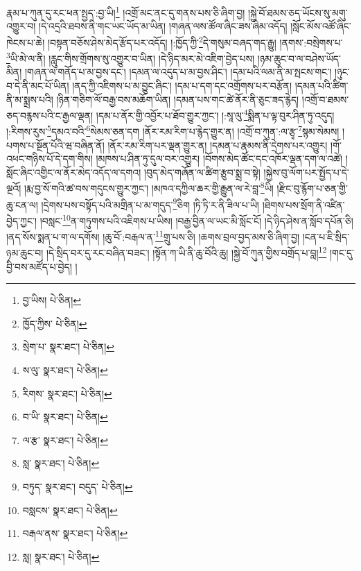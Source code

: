 རྣམ་པ་ཀུན་དུ་རང་ཕན་སྤྱད་:བྱ་ཡི།\footnote{བྱ་ཡིས།  པེ་ཅིན། } །འགྲོ་མང་ནང་དུ་གནས་པས་ཅི་ཞིག་བྱ། །སྐྱེ་བོ་ཐམས་ཅད་ཡོངས་སུ་མགུ་འགྱུར་བ། །དེ་འདྲའི་ཐབས་ནི་གང་ཡང་ཡོད་མ་ཡིན། །གཞན་ལས་ཚོལ་ཞིང་ཟས་ཞིམ་འདོད། །སློང་མོས་འཚོ་ཞིང་ཁེངས་པ་ཆེ། །བསྟན་བཅོས་ཤེས་མེད་རྩོད་པར་འདོད། །:ཁྱོད་ཀྱི་\footnote{ཁྱོད་ཀྱིས་  པེ་ཅིན། }དེ་གསུམ་བཞད་གད་རྒྱུ། །ནགས་:བསྲེགས་པ་\footnote{སྲེག་པ་  སྣར་ཐང་།  པེ་ཅིན། }ཡི་མེ་ལ་ནི། །རླུང་གིས་གྲོགས་སུ་འགྱུར་བ་ཡིན། །དེ་ཉིད་མར་མེ་འཇིག་བྱེད་པས། །ཉམ་ཆུང་བ་ལ་བཤེས་ཡོད་མིན། །གཞན་ལ་གནོད་པ་མ་བྱས་དང་། །དམན་ལ་འདུད་པ་མ་བྱས་ཤིང་། །དམ་པའི་ལམ་ནི་མ་སྤངས་གང་། །ཉུང་བ་དེ་ནི་མང་པོ་ཡིན། །ནད་ཀྱི་འཇིགས་པ་མ་བྱུང་ཞིང་། །དམ་པ་དག་དང་འགྲོགས་པར་བརྩོན། །དམན་པའི་ཚིག་ནི་མ་སྨྲས་པའི། །ཉིན་གཅིག་ལོ་བརྒྱ་བས་མཆོག་ཡིན། །དམན་པས་གང་ཚེ་ནོར་ནི་ཅུང་ཟད་རྙེད། །འགྲོ་བ་ཐམས་ཅད་བརྙས་པའི་ང་རྒྱལ་ལྡན། །དམ་པ་ནོར་གྱི་འབྱོར་པ་ཐོབ་གྱུར་ཀྱང་། །:སཱ་ལུ་\footnote{ས་ལུ་  སྣར་ཐང་།  པེ་ཅིན། }སྨིན་པ་ལྟ་བུར་ཤིན་ཏུ་འདུད། །:རིགས་རུས་\footnote{རིགས་  སྣར་ཐང་།  པེ་ཅིན། }དམའ་བའི་\footnote{བ་ཡི་  སྣར་ཐང་།  པེ་ཅིན། }སེམས་ཅན་དག །ནོར་རམ་རིག་པ་རྙེད་གྱུར་ན། །འགྲོ་བ་ཀུན་:ལ་རྩྭ་\footnote{ལ་རྩ་  སྣར་ཐང་།  པེ་ཅིན། }སྙམ་སེམས། །པགས་པ་སྔོན་པོའི་ཝ་བཞིན་ནོ། །ནོར་རམ་རིག་པར་ལྡན་གྱུར་ན། །དམན་པ་རྣམས་ནི་དྲེགས་པར་འགྱུར། །གོ་འཕང་གཉིས་པོ་དེ་དག་གིས། །མཁས་པ་ཤིན་ཏུ་དུལ་བར་འགྱུར། །བོགས་མེད་ཚོང་དང་འཁོར་ལྡན་དག་ལ་འཚེ། །སློང་ཞིང་འགྱིང་ལ་ནོར་མེད་འདོད་ལ་དགའ། །བུད་མེད་གཞོན་ལ་ཚིག་རྩུབ་སྨྲ་བ་སྟེ། །སྐྱེས་བུ་ལོག་པར་སྤྱོད་པ་དེ་ལྔའོ། །རྨ་བྱ་སོ་གའི་ཚ་བས་གདུངས་གྱུར་ཀྱང་། །མཁའ་དཀྱིལ་ཆར་གྱི་རྒྱུན་ལ་རེ་བླ་\footnote{སླ་  སྣར་ཐང་།  པེ་ཅིན། }ཡི། །རྫིང་བུ་རྙོག་པ་ཅན་གྱི་ཆུ་ངན་ལ། །དྲེགས་པས་བསྟོད་པའི་མགྲིན་པ་མ་གདུད་\footnote{བཏུད་  སྣར་ཐང་། བདུད་  པེ་ཅིན། }ཅིག །ཏི་ཏི་ར་ནི་ཟིལ་པ་ཡི། །ཐིགས་པས་སྲོག་ནི་འཛིན་བྱེད་ཀྱང་། །བསླང་\footnote{བསླངས་  སྣར་ཐང་།  པེ་ཅིན། }ན་གཏུགས་པའི་འཇིགས་པ་ཡིས། །བརྒྱ་བྱིན་ལ་ཡང་མི་སློང་ངོ། །དེ་ཉིད་ཤེས་ན་སློབ་དཔོན་ཅི། །ནད་སོས་སྨན་པ་ག་ལ་དགོས། །ཆུ་བོ་:བརྒལ་ན་\footnote{བརྒལ་ནས་  སྣར་ཐང་།  པེ་ཅིན། }གྲུ་པས་ཅི། །ཆགས་བྲལ་བྱད་མས་ཅི་ཞིག་བྱ། །ངན་པ་ཇི་སྲིད་ཉམ་ཆུང་བ། །དེ་སྲིད་བར་དུ་རང་བཞིན་བཟང་། །སྟོན་ཀ་ཡི་ནི་ཆུ་བོའི་ཆུ། །སྐྱེ་བོ་ཀུན་གྱིས་བགྲོད་པ་བླ།\footnote{སླ།  སྣར་ཐང་།  པེ་ཅིན། } །གང་དུ་བྱི་བས་མཛོད་པ་བྱེད། །

